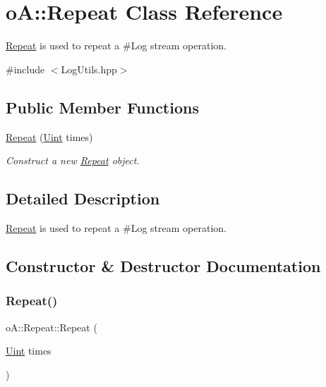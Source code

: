 \hypertarget{classo_a_1_1_repeat}{}\section{oA\+:\+:Repeat Class Reference}
\label{classo_a_1_1_repeat}


\mbox{\hyperlink{classo_a_1_1_repeat}{Repeat}} is used to repeat a \#\+Log stream operation.  




{\ttfamily \#include $<$Log\+Utils.\+hpp$>$}

\subsection*{Public Member Functions}
\begin{DoxyCompactItemize}
\item 
\mbox{\hyperlink{classo_a_1_1_repeat_acced7bf3a3daff1434569dc593e2de0e}{Repeat}} (\mbox{\hyperlink{namespaceo_a_abe1d8250226c5cf34f84d7b75fc7922e}{Uint}} times)
\begin{DoxyCompactList}\small\item\em Construct a new \mbox{\hyperlink{classo_a_1_1_repeat}{Repeat}} object. \end{DoxyCompactList}\end{DoxyCompactItemize}


\subsection{Detailed Description}
\mbox{\hyperlink{classo_a_1_1_repeat}{Repeat}} is used to repeat a \#\+Log stream operation. 

\subsection{Constructor \& Destructor Documentation}
\mbox{\label{classo_a_1_1_repeat_acced7bf3a3daff1434569dc593e2de0e}} 
\subsubsection{\texorpdfstring{Repeat()}{Repeat()}}
{\footnotesize\ttfamily o\+A\+::\+Repeat\+::\+Repeat (\begin{DoxyParamCaption}\item[{\mbox{\hyperlink{namespaceo_a_abe1d8250226c5cf34f84d7b75fc7922e}{Uint}}}]{times }\end{DoxyParamCaption})\hspace{0.3cm}{\ttfamily [inline]}}



